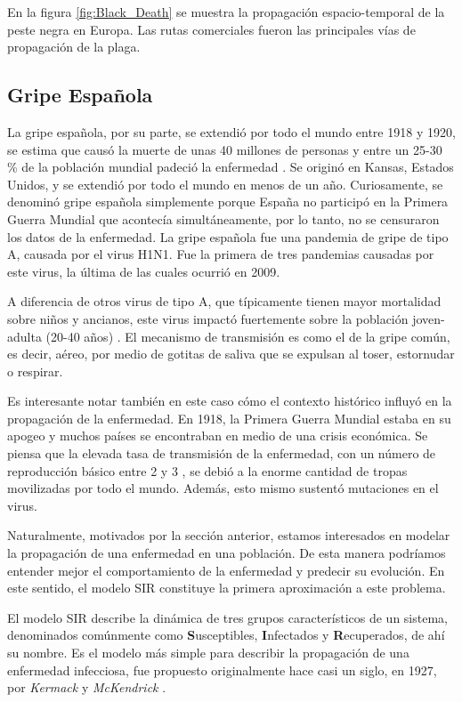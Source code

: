 En la figura \ref{fig:Black_Death} se muestra la propagación espacio-temporal de la peste negra en Europa. Las rutas comerciales fueron las principales vías de 
propagación de la plaga.

\subsection*{Gripe Española}

La gripe española, por su parte, se extendió por todo el mundo entre 1918 y 1920, se estima que causó la muerte de unas 40 millones de personas y entre un 25-30 \% de la 
población mundial padeció la enfermedad \cite{gripe2}. Se originó en Kansas, Estados Unidos, y se extendió por todo el mundo en menos de un año. Curiosamente, se denominó gripe
española simplemente porque España no participó en la Primera Guerra Mundial que acontecía simultáneamente, por lo tanto, no se censuraron los datos de la enfermedad.
La gripe española fue una pandemia de gripe de tipo A, causada por el virus H1N1. Fue la primera de tres pandemias causadas por este virus, la última de
las cuales ocurrió en 2009. 

A diferencia de otros virus de tipo A, que típicamente tienen mayor mortalidad sobre niños y ancianos, este virus impactó fuertemente sobre la población 
joven-adulta (20-40 años) \cite{gripe3}. El mecanismo de transmisión es como el de la gripe común, es decir, aéreo, por 
medio de gotitas de saliva que se expulsan al toser, estornudar o respirar.

Es interesante notar también en este caso cómo el contexto histórico influyó en la propagación de la enfermedad. En 1918, la Primera Guerra Mundial estaba en su apogeo y 
muchos países se encontraban en medio de una crisis económica. Se piensa que la elevada tasa de transmisión de la enfermedad, con un número de reproducción básico entre 
2 y 3 \cite{gripe}, se debió a la enorme cantidad de tropas movilizadas por todo el mundo. Además, esto mismo sustentó mutaciones en el virus. 




Naturalmente, motivados por la sección anterior, estamos interesados en modelar la propagación de una enfermedad en una población. De esta manera podríamos entender 
mejor el comportamiento de la enfermedad y predecir su evolución. En este sentido, el modelo SIR constituye la primera aproximación a este problema.

El modelo SIR describe la dinámica de tres grupos característicos de un sistema, denominados comúnmente como \textbf{S}usceptibles, \textbf{I}nfectados y
\textbf{R}ecuperados, de ahí su nombre. Es el modelo más simple para describir la propagación de una enfermedad 
infecciosa, fue propuesto originalmente hace casi un siglo, en 1927, por \textit{Kermack} y \textit{McKendrick} \cite{SIR}. 

